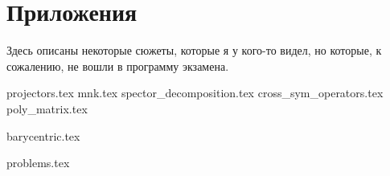 \documentclass[a4paper, 11pt]{article}
\begin{document}
\newpage

\setcounter{problem}{0}

\section{Приложения}

Здесь описаны некоторые сюжеты, которые я у кого-то видел, но которые, к сожалению, не вошли в программу экзамена.

{projectors.tex}
{mnk.tex}
{spector_decomposition.tex}
{cross_sym_operators.tex}
{poly_matrix.tex}

\renewcommand{\A}{\mathfrak{A}}
\renewcommand{\B}{\mathfrak{B}}

{barycentric.tex}

\renewcommand{\A}{\mathcal{A}}
\renewcommand{\B}{\mathcal{B}}

\newpage

\setcounter{problem}{0}

{problems.tex}
\end{document}
